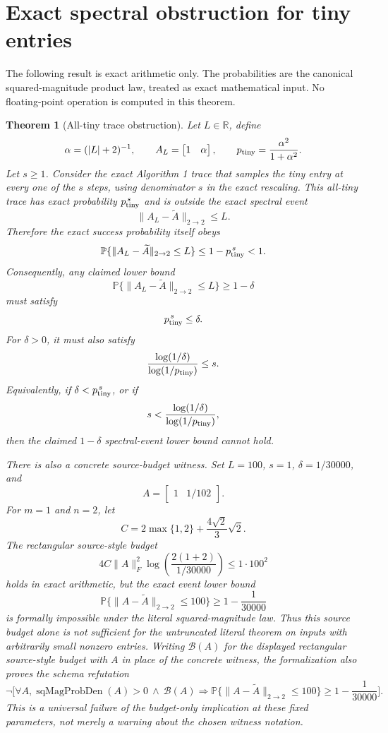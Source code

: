 \documentclass[11pt]{article}
\newcommand{\Prob}{\mathbb{P}}
\newcommand{\R}{\mathbb{R}}
\newtheorem{theorem}{Theorem}
\theoremstyle{definition}
\theoremstyle{remark}
\begin{document}
\section*{Exact spectral obstruction for tiny entries}

The following result is exact arithmetic only.  The probabilities are the
canonical squared-magnitude product law, treated as exact mathematical input.
No floating-point operation is computed in this theorem.

\begin{theorem}[All-tiny trace obstruction]
Let \(L\in\R\), define
\[
  \alpha=(|L|+2)^{-1},
  \qquad
  A_L=\begin{bmatrix}1&\alpha\end{bmatrix},
  \qquad
  p_{\rm tiny}=\frac{\alpha^2}{1+\alpha^2}.
\]
Let \(s\ge1\).  Consider the exact Algorithm 1 trace that samples the tiny
entry at every one of the \(s\) steps, using denominator \(s\) in the exact
rescaling.  This all-tiny trace has exact probability \(p_{\rm tiny}^{\,s}\)
and is outside the exact spectral event
\[
  \|A_L-\widetilde A\|_{2\to2}\le L.
\]
Therefore the exact success probability itself obeys
\[
  \Prob\{\|A_L-\widetilde A\|_{2\to2}\le L\}
  \le
  1-p_{\rm tiny}^{\,s}
  <
  1.
\]
Consequently, any claimed lower bound
\[
  \Prob\{\|A_L-\widetilde A\|_{2\to2}\le L\}\ge1-\delta
\]
must satisfy
\[
  p_{\rm tiny}^{\,s}\le\delta.
\]
For \(\delta>0\), it must also satisfy
\[
  \frac{\log(1/\delta)}{\log(1/p_{\rm tiny})}\le s.
\]
Equivalently, if \(\delta<p_{\rm tiny}^{\,s}\), or if
\[
  s<\frac{\log(1/\delta)}{\log(1/p_{\rm tiny})},
\]
then the claimed \(1-\delta\) spectral-event lower bound cannot hold.

There is also a concrete source-budget witness.  Set \(L=100\), \(s=1\),
\(\delta=1/30000\), and
\[
  A=\begin{bmatrix}1&1/102\end{bmatrix}.
\]
For \(m=1\) and \(n=2\), let
\[
  C=2\max\{1,2\}+\frac{4\sqrt2}{3}\sqrt{2}.
\]
The rectangular source-style budget
\[
  4C\|A\|_F^2
    \log\!\left(\frac{2(1+2)}{1/30000}\right)
  \le
  1\cdot 100^2
\]
holds in exact arithmetic, but the exact event lower bound
\[
  \Prob\{\|A-\widetilde A\|_{2\to2}\le100\}
  \ge 1-\frac{1}{30000}
\]
is formally impossible under the literal squared-magnitude law.  Thus this
source budget alone is not sufficient for the untruncated literal theorem on
inputs with arbitrarily small nonzero entries.
Writing \(\mathcal B(A)\) for the displayed rectangular source-style budget
with \(A\) in place of the concrete witness, the formalization also proves the
schema refutation
\[
  \neg\Big[
    \forall A,
    \operatorname{sqMagProbDen}(A)>0
    \ \wedge\
    \mathcal B(A)
    \Longrightarrow
    \Prob\{\|A-\widetilde A\|_{2\to2}\le100\}
      \ge 1-\frac{1}{30000}
  \Big].
\]
This is a universal failure of the budget-only implication at these fixed
parameters, not merely a warning about the chosen witness notation.
\end{theorem}
\end{document}
